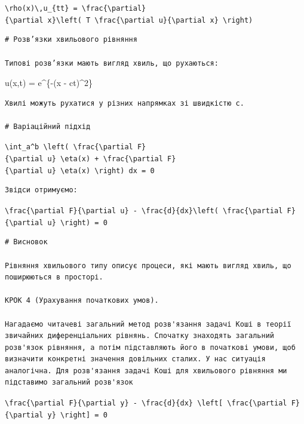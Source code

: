 \documentclass[
  ukrainian,
]{article}
\begin{document}
\texttt{\textbackslash{}rho(x)\textbackslash{},u\_\{tt\}\ =\ \textbackslash{}frac\{\textbackslash{}partial\}\{\textbackslash{}partial\ x\}\textbackslash{}left(\ T\ \textbackslash{}frac\{\textbackslash{}partial\ u\}\{\textbackslash{}partial\ x\}\ \textbackslash{}right)}

\begin{verbatim}
# Розв’язки хвильового рівняння

Типові розв’язки мають вигляд хвиль, що рухаються:
\end{verbatim}

u(x,t) = e\^{}\{-(x - ct)\^{}2\}

\begin{verbatim}
Хвилі можуть рухатися у різних напрямках зі швидкістю c.

# Варіаційний підхід
\end{verbatim}

\texttt{\textbackslash{}int\_a\^{}b\ \textbackslash{}left(\ \textbackslash{}frac\{\textbackslash{}partial\ F\}\{\textbackslash{}partial\ u\}\ \textbackslash{}eta(x)\ +\ \textbackslash{}frac\{\textbackslash{}partial\ F\}\{\textbackslash{}partial\ u\textquotesingle{}\}\ \textbackslash{}eta\textquotesingle{}(x)\ \textbackslash{}right)\ dx\ =\ 0}

\begin{verbatim}
Звідси отримуємо:
\end{verbatim}

\texttt{\textbackslash{}frac\{\textbackslash{}partial\ F\}\{\textbackslash{}partial\ u\}\ -\ \textbackslash{}frac\{d\}\{dx\}\textbackslash{}left(\ \textbackslash{}frac\{\textbackslash{}partial\ F\}\{\textbackslash{}partial\ u\textquotesingle{}\}\ \textbackslash{}right)\ =\ 0}

\begin{verbatim}
# Висновок

Рівняння хвильового типу описує процеси, які мають вигляд хвиль, що поширюються в просторі.

КРОК 4 (Урахування початкових умов).

Нагадаємо читачеві загальний метод розв'язання задачі Коші в теорії звичайних диференціальних рівнянь. Спочатку знаходять загальний розв'язок рівняння, а потім підставляють його в початкові умови, щоб визначити конкретні значення довільних сталих. У нас ситуація аналогічна. Для розв'язання задачі Коші для хвильового рівняння ми підставимо загальний розв'язок
\end{verbatim}

\texttt{\textbackslash{}frac\{\textbackslash{}partial\ F\}\{\textbackslash{}partial\ y\}\ -\ \textbackslash{}frac\{d\}\{dx\}\ \textbackslash{}left{[}\ \textbackslash{}frac\{\textbackslash{}partial\ F\}\{\textbackslash{}partial\ y\textquotesingle{}\}\ \textbackslash{}right{]}\ =\ 0}
\end{document}
